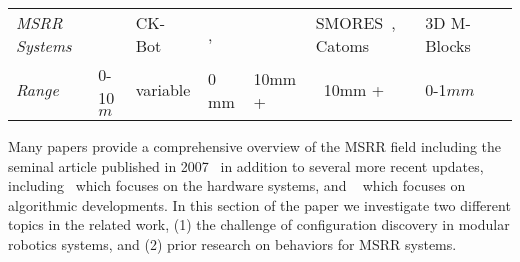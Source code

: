 \begin{table*}[h]
\begin{tabular}{ p{2.4 cm} p{\wdd}  p{\wdd} p{\wdd} p{\wdd} p{\wdd} p{\wdd} p{\wdd}  }
		\addlinespace[1ex] 	\textit{MSRR Systems}
		& \cite{StigmergyWerfel2006}	%
		& CK-Bot~\cite{park2008automatic}					%
		& \cite{Soldercubes2016}, ~\cite{ubot-Zhu-2014}	%
		& \cite{lin2017vision}								%
		& SMORES~\cite{TosunDaveyLiuYim-IROS2016}, Catoms~\cite{Kirby-IROS07}					%
		& 3D M-Blocks~\cite{Romanishin20153d}	\\ 			%
		
		\addlinespace[1ex] 	\textit{Range}			& 0-10$m$			& variable				& 0 mm				& 10mm +			& ~10mm +			& 0-1$mm$	\\
	\end{tabular}
	\label{tab:tagTech}
\end{table*}


Many papers provide a comprehensive overview of the MSRR field including the seminal article published in 2007~\cite{Yim-RAM07} in addition to several more recent updates, including~\cite{chennareddy2017modular} which focuses on the hardware systems, and ~\cite{abukhalil2013survey} which focuses on algorithmic developments. In this section of the paper we investigate two different topics in the related work, (1) the challenge of configuration discovery in modular robotics systems, and (2) prior research on behaviors for MSRR systems.

